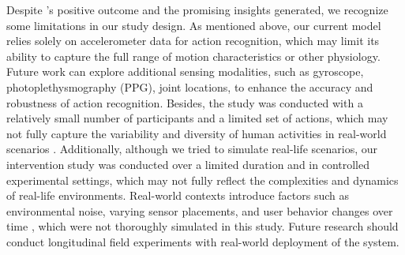 Despite \projectname's positive outcome and the promising insights generated, we recognize some limitations in our study design.
As mentioned above, our current model relies solely on accelerometer data for action recognition, which may limit its ability to capture the full range of motion characteristics or other physiology. Future work can explore additional sensing modalities, such as gyroscope, photoplethysmography (PPG), joint locations, to enhance the accuracy and robustness of action recognition. 
Besides, the study was conducted with a relatively small number of participants and a limited set of actions, which may not fully capture the variability and diversity of human activities in real-world scenarios \cite{trapp2015individual, narayanan2013behavioral}.
Additionally, although we tried to simulate real-life scenarios, our intervention study was conducted over a limited duration and in controlled experimental settings, which may not fully reflect the complexities and dynamics of real-life environments. 
Real-world contexts introduce factors such as environmental noise, varying sensor placements, and user behavior changes over time \cite{trapp2015individual,truong2015deployment,mejia2023enhancing,mills2022development}, which were not thoroughly simulated in this study. Future research should conduct longitudinal field experiments with real-world deployment of the system.



